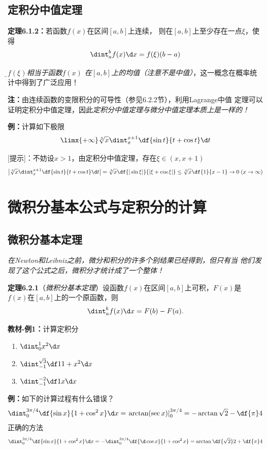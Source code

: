 \subsection{定积分中值定理}

{\bf 定理6.1.2：}若函数$f(x)$在区间$[a,b]$上连续，
则在$[a,b]$上至少存在一点$\xi$，使得
$$\dint_a^bf(x)\d x=f(\xi)(b-a)$$

{\it\b $f(\xi)$相当于函数$f(x)$
在$[a,b]$上的均值（注意不是中值）}，这一概念在概率统计中得到了广泛应用！

{\bf 注：}由连续函数的变限积分的可导性（参见6.2.2节），利用Lagrange中值
定理可以证明定积分中值定理，因此{\it 定积分中值定理与微分中值定理本质上是一样的！}

{\bf 例：}计算如下极限
$$\limx{+\infty}\sqrt[3]x\dint_x^{x+1}\df{\sin t}{t+\cos t}\d t$$

[提示]：不妨设$x>1$，由定积分中值定理，存在$\xi\in(x,x+1)$
$$\left|\sqrt[3]x\dint_x^{x+1}\df{\sin t}{t+\cos t}\d t\right|
=\sqrt[3]x\df{|\sin\xi|}{|\xi+\cos\xi|}\leq\sqrt[3]x\df{1}{x-1}
\to0\;(x\to\infty)$$


\section{微积分基本公式与定积分的计算}

\subsection{微积分基本定理}

{\it 在Newton和Leibniz之前，微分和积分的许多个别结果已经得到，但只有当
他们发现了这个公式之后，微积分才统计成了一个整体！}

{\bf 定理6.2.1}（{\it 微积分基本定理}）设函数$f(x)$在区间$[a,b]$上可积，$F(x)$是
$f(x)$在$[a,b]$上的一个原函数，则
$$\dint_a^bf(x)\d x=F(b)-F(a).$$

{\bf 教材-例1：}计算定积分
\begin{enumerate}[(1)]
  \setlength{\itemindent}{1cm}
  \item $\dint_{0}^{1}x^2 \d x$
  \item $\dint_{-1}^{\sqrt 3}\df 1{1+x^2}\d x$
  \item $\dint_{-1}^{-2}\df 1x\d x$
\end{enumerate}

{\bf 例：}如下的计算过程有什么错误？
$$\dint_0^{3\pi/4}\df{\sin x}{1+\cos^2x}\d x
=\left.\arctan(\sec x)\right|_0^{3\pi/4}=-\arctan\sqrt2-\df{\pi}4$$
正确的方法
$$\dint_0^{3\pi/4}\df{\sin x}{1+\cos^2x}\d x
=-\dint_0^{3\pi/4}\df{\d\cos x}{1+\cos^2x}=\arctan\df{\sqrt2}2
+\df{\pi}4$$

